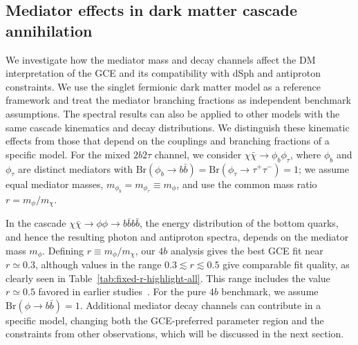 \documentclass[superscriptaddress,
showpacs,preprintnumbers,nofootinbib,eqsecnum,amsmath,amssymb,aps,11pt, groupedaddress, floatfix]{revtex4-2}
\begin{document}
\subsection{Mediator effects in dark matter cascade annihilation}
\label{sec:mediator}


We investigate how the mediator mass and decay channels affect the DM interpretation of the GCE and its compatibility with dSph and antiproton constraints.
We use the singlet fermionic dark matter model as a reference framework and treat the mediator branching fractions as independent benchmark assumptions.
The spectral results can also be applied to other models with the same cascade kinematics and decay distributions.
We distinguish these kinematic effects from those that depend on the couplings and branching fractions of a specific model.
For the mixed $2b2\tau$ channel, we consider $\chi\bar{\chi}\to \phi_b \phi_\tau$, where $\phi_b$
and $\phi_\tau$ are distinct mediators with $\mathrm{Br}(\phi_b\to b\bar b)=
\mathrm{Br}(\phi_\tau\to\tau^+\tau^-)=1$; we assume equal mediator masses,
$m_{\phi_b}=m_{\phi_\tau}\equiv m_\phi$,
and use the common mass ratio $r=m_\phi/m_\chi$.

In the cascade $\chi\bar{\chi}\to\phi\phi\to
b\bar{b}b\bar{b}$, the energy distribution of the bottom quarks,
and hence the resulting photon and antiproton spectra, depends on the mediator mass $m_\phi$.
Defining $r \equiv m_\phi/m_\chi$, our $4b$ analysis gives the best GCE fit near $r\simeq0.3$, although values in
the range $0.3\lesssim r\lesssim 0.5$ give comparable fit quality, as clearly seen in Table~\ref{tab:fixed-r-highlight-all}.
This range includes the value $r \simeq 0.5$ favored in earlier studies~\cite{Dutta:2015ysa, Kim:2016csm}.
For the pure $4b$ benchmark, we assume
$\mathrm{Br}(\phi\to b\bar{b})=1$.
Additional mediator decay channels can contribute in a specific model, changing both the GCE-preferred
parameter region and the constraints from other observations, which will be discussed in the next section.
\end{document}
